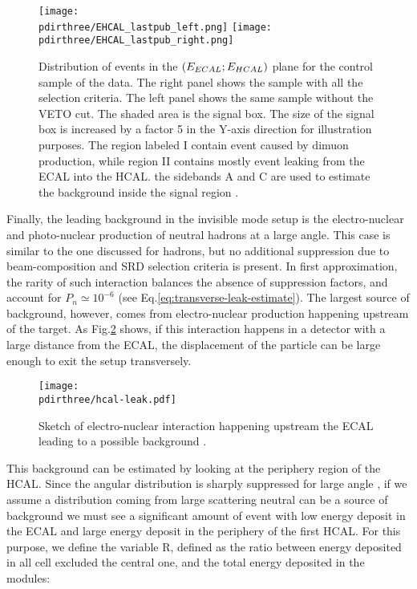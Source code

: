 \begin{figure}[bth!]
  \centering
  \texttt{[image: \\pdirthree/EHCAL\_lastpub\_left.png]}
  \texttt{[image: \\pdirthree/EHCAL\_lastpub\_right.png]}
  \caption[ECAL vs HCAL events band]{Distribution of events in the $(E_{ECAL};E_{HCAL})$ plane for the control sample of the data. The right panel shows the sample with all the selection criteria. The left panel shows the same sample without the VETO cut. The shaded area is the signal box. The size of the signal box is increased by a factor 5 in the Y-axis direction for illustration purposes. The region labeled I contain event caused by dimuon production, while region II contains mostly event leaking from the ECAL into the HCAL. the sidebands A and C are used to estimate the background inside the signal region \cite{NA64:2019imj}.}
  \label{fig:ehcal-bkg-bands}
\end{figure}

Finally, the leading background in the invisible mode setup is the electro-nuclear and photo-nuclear production of neutral hadrons at a large angle. This case is similar to the one discussed for hadrons, but no additional suppression due to beam-composition and SRD selection criteria is present. In first approximation, the rarity of such interaction balances the absence of suppression factors, and account for $P_n \simeq 10^{-6}$ (see Eq.\ref{eq:transverse-leak-estimate}).
The largest source of background, however, comes from electro-nuclear production happening upstream of the target. As Fig.\ref{fig:eh-prod-sketch} shows, if this interaction happens in a detector with a large distance from the ECAL, the displacement of the particle can be large enough to exit the setup transversely. 


\begin{figure}[bth!]
  \centering
  \texttt{[image: \\pdirthree/hcal-leak.pdf]}
  \caption[upstream electro-hadron production upstream]{Sketch of electro-nuclear interaction happening upstream the ECAL leading to a possible background \cite{pdegen-thesis}.}
  \label{fig:eh-prod-sketch}
\end{figure}

This background can be estimated by looking at the periphery region of the HCAL. Since the angular distribution is sharply suppressed for large angle \cite{AUTIERO1998285,GNINENKO1998583}, if we assume a distribution coming from large scattering neutral can be a source of background we must see a significant amount of event with low energy deposit in the ECAL and large energy deposit in the periphery of the first HCAL. For this purpose, we define the variable R, defined as the ratio between energy deposited in all cell excluded the central one, and the total energy deposited in the modules:

